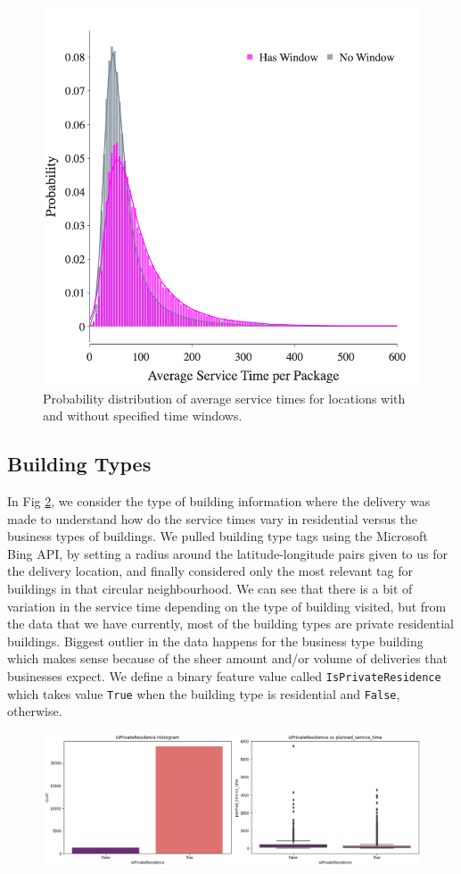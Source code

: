 \documentclass[12pt]{article}
\theoremstyle{plain}
\numberwithin{equation}{section}
\begin{document}
\begin{figure}[h!]
\centering
\includegraphics[width=.5\textwidth]{Images/has_vs_no_window.png}
\caption{Probability distribution of average service times for locations with and without specified time windows.}
\label{fig:has_window}
\end{figure}


\subsection{Building Types}

In Fig \ref{fig:building_type}, we consider the type of building information where the delivery was made to understand how do the service times vary in residential versus the business types of buildings. We pulled building type tags using the Microsoft Bing API, by setting a radius around the latitude-longitude pairs given to us for the delivery location, and finally considered only the most relevant tag for buildings in that circular neighbourhood. We can see that there is a bit of variation in the service time depending on the type of building visited, but from the data that we have currently, most of the building types are private residential buildings. Biggest outlier in the data happens for the business type building which makes sense because of the sheer amount and/or volume of deliveries that businesses expect. We define a binary feature value called \texttt{IsPrivateResidence} which takes value \texttt{True} when the building type is residential and \texttt{False}, otherwise.

\begin{figure}
\centering
\includegraphics[width=18cm]{Images/building_type.png}
\caption{}
\label{fig:building_type}
\end{figure}
\end{document}
